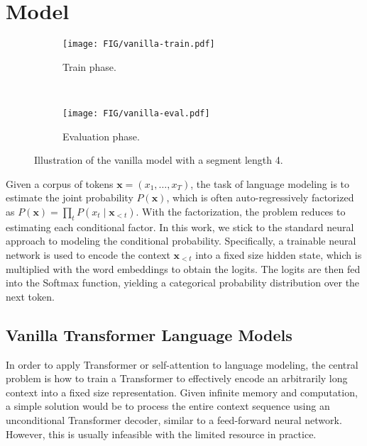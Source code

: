 \documentclass[11pt,a4paper]{article}
\def\rvx{{\mathbf{x}}}
\newcommand{\rulesep}{\unskip\ \vrule\ }
\begin{document}
 \section{Model} \label{sec:model}
\begin{figure*}[t]
	\begin{subfigure}[b]{0.292\linewidth}
		\texttt{[image: FIG/vanilla-train.pdf]}
		\caption{\small Train phase.}
		\label{fig:vanilla-train}
	\end{subfigure}
	\rulesep
	\begin{subfigure}[b]{0.69\linewidth}
		\texttt{[image: FIG/vanilla-eval.pdf]}
		\caption{\small Evaluation phase.}
		\label{fig:vanilla-eval}
	\end{subfigure}
	\caption{\small Illustration of the vanilla model with a segment length 4.}
	\label{fig:vanilla}
\vspace{-1em}
\end{figure*}

Given a corpus of tokens $\rvx = (x_1 , \dots, x_T)$, the task of language modeling is to estimate the joint probability $P(\rvx)$, which is often auto-regressively factorized as $P(\rvx) = \prod_{t} P(x_t \mid \rvx_{<t})$.
With the factorization, the problem reduces to estimating each conditional factor.
In this work, we stick to the standard neural approach to modeling the conditional probability.
Specifically, a trainable neural network is used to encode the context $\rvx_{<t}$ into a fixed size hidden state, which is multiplied with the word embeddings to obtain the logits.
The logits are then fed into the Softmax function, yielding a categorical probability distribution over the next token.

\subsection{Vanilla Transformer Language Models}
In order to apply Transformer or self-attention to language modeling, the central problem is how to train a Transformer to effectively encode an arbitrarily long context into a fixed size representation.
Given infinite memory and computation, a simple solution would be to process the entire context sequence using an unconditional Transformer decoder, similar to a feed-forward neural network.
However, this is usually infeasible with the limited resource in practice.
\end{document}
